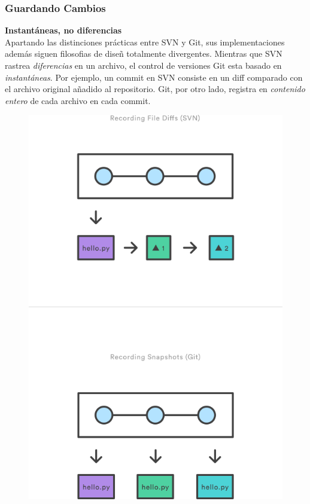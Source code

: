 \documentclass[8pt]{beamer}
\begin{document}
\begin{frame}
\frametitle{Guardando Cambios}
\textbf{Instant\'aneas, no diferencias}\\
\medskip
Apartando las distinciones pr\'acticas entre SVN y Git, sus implementaciones adem\'as siguen filosofias de dise\~n totalmente divergentes. Mientras que SVN rastrea \emph{diferencias} en un archivo, el control de versiones Git esta basado en \emph{instant\'aneas}. Por ejemplo, un commit en SVN consiste en un diff comparado con el archivo original a\~nadido al repositorio. Git, por otro lado, registra en \emph{contenido entero} de cada archivo en cada commit.
\begin{figure}
  \centering
  \includegraphics[scale=0.2]{imagenes/05.png}
\end{figure}
\end{frame}
\end{document}
